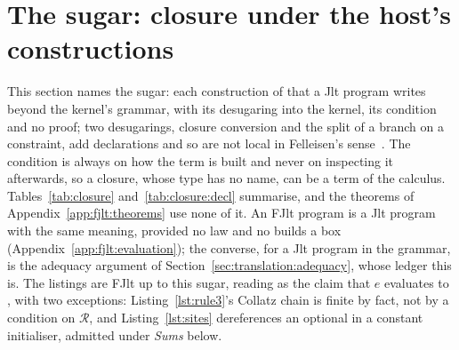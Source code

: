 \section{The sugar: closure under the host's constructions}
\label{app:fjlt:closure}
This section names the sugar: each construction of \Cpp{} that a Jlt program writes beyond the kernel's grammar, with its desugaring into the kernel, its condition and no proof; two desugarings, closure conversion and the split of a branch on a constraint, add declarations and so are not local in Felleisen's sense~\cite{felleisen1991expressive}.
The condition is always on how the term is built and never on inspecting it afterwards, so a closure, whose type has no name, can be a term of the calculus.
Tables~\ref{tab:closure} and~\ref{tab:closure:decl} summarise, and the theorems of Appendix~\ref{app:fjlt:theorems} use none of it.
An FJlt program is a Jlt program with the same meaning, provided no law and no  builds a box (Appendix~\ref{app:fjlt:evaluation}); the converse, for a Jlt program in the grammar, is the adequacy argument of Section~\ref{sec:translation:adequacy}, whose ledger this is.
The listings are FJlt up to this sugar, reading  as the claim that $e$ evaluates to , with two exceptions: Listing~\ref{lst:rule3}'s Collatz chain is finite by fact, not by a condition on $\mathcal{R}$, and Listing~\ref{lst:sites} dereferences an optional in a constant initialiser, admitted under \emph{Sums} below.

